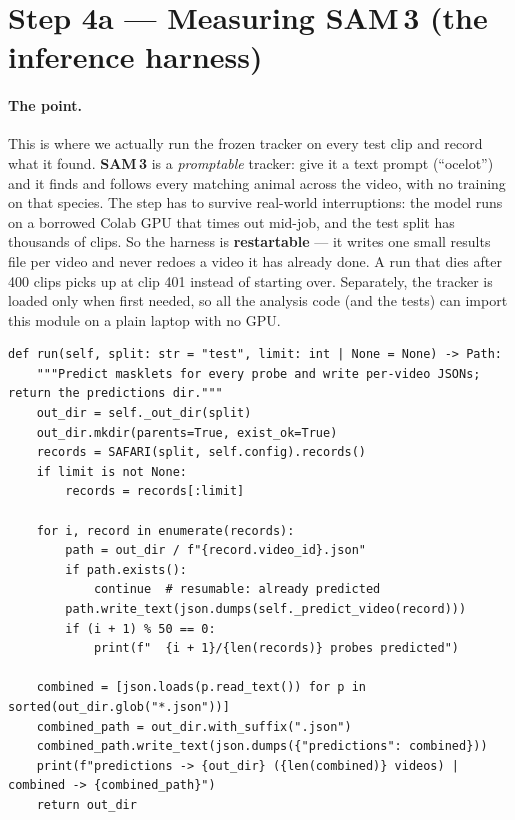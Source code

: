 \documentclass[11pt,a4paper]{article}
\newcommand{\srcfile}[1]{\smallskip\noindent{\footnotesize\color{navy}\ttfamily\textbf{#1}}\par\nobreak\vspace{-0.15em}}
\begin{document}
\section{Step 4a --- Measuring SAM\,3 (the inference harness)}

\paragraph{The point.}
This is where we actually run the frozen tracker on every test clip and record what it found. \textbf{SAM\,3}
is a \emph{promptable} tracker: give it a text prompt (``ocelot'') and it finds and follows every matching
animal across the video, with no training on that species. The step has to survive real-world
interruptions: the model runs on a borrowed Colab GPU that times out mid-job, and the test split has
thousands of clips. So the harness is \textbf{restartable} --- it writes one small results file per video
and never redoes a video it has already done. A run that dies after 400 clips picks up at clip 401 instead
of starting over. Separately, the tracker is loaded only when first needed, so all the analysis code (and
the tests) can import this module on a plain laptop with no GPU.

\srcfile{src/inference/harness.py}
\begin{lstlisting}[style=py]
def run(self, split: str = "test", limit: int | None = None) -> Path:
    """Predict masklets for every probe and write per-video JSONs; return the predictions dir."""
    out_dir = self._out_dir(split)
    out_dir.mkdir(parents=True, exist_ok=True)
    records = SAFARI(split, self.config).records()
    if limit is not None:
        records = records[:limit]

    for i, record in enumerate(records):
        path = out_dir / f"{record.video_id}.json"
        if path.exists():
            continue  # resumable: already predicted
        path.write_text(json.dumps(self._predict_video(record)))
        if (i + 1) % 50 == 0:
            print(f"  {i + 1}/{len(records)} probes predicted")

    combined = [json.loads(p.read_text()) for p in sorted(out_dir.glob("*.json"))]
    combined_path = out_dir.with_suffix(".json")
    combined_path.write_text(json.dumps({"predictions": combined}))
    print(f"predictions -> {out_dir} ({len(combined)} videos) | combined -> {combined_path}")
    return out_dir
\end{lstlisting}
\end{document}
